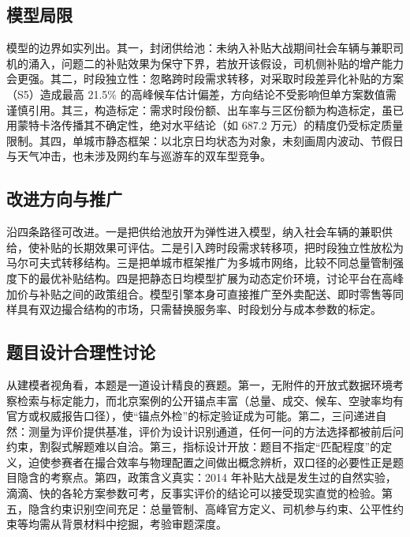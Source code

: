 \documentclass[12pt,a4paper]{ctexart}
\begin{document}
\subsection{模型局限}

模型的边界如实列出。其一，封闭供给池：未纳入补贴大战期间社会车辆与兼职司机的涌入，问题二的补贴效果为保守下界，若放开该假设，司机侧补贴的增产能力会更强。其二，时段独立性：忽略跨时段需求转移，对采取时段差异化补贴的方案（S5）造成最高 21.5\% 的高峰候车估计偏差，方向结论不受影响但单方案数值需谨慎引用。其三，构造标定：需求时段份额、出车率与三区份额为构造标定，虽已用蒙特卡洛传播其不确定性，绝对水平结论（如 687.2 万元）的精度仍受标定质量限制。其四，单城市静态框架：以北京日均状态为对象，未刻画周内波动、节假日与天气冲击，也未涉及网约车与巡游车的双车型竞争。

\subsection{改进方向与推广}

沿四条路径可改进。一是把供给池放开为弹性进入模型，纳入社会车辆的兼职供给，使补贴的长期效果可评估。二是引入跨时段需求转移项，把时段独立性放松为马尔可夫式转移结构。三是把单城市框架推广为多城市网络，比较不同总量管制强度下的最优补贴结构。四是把静态日均模型扩展为动态定价环境，讨论平台在高峰加价与补贴之间的政策组合。模型引擎本身可直接推广至外卖配送、即时零售等同样具有双边撮合结构的市场，只需替换服务率、时段划分与成本参数的标定。

\subsection{题目设计合理性讨论}

从建模者视角看，本题是一道设计精良的赛题。第一，无附件的开放式数据环境考察检索与标定能力，而北京案例的公开锚点丰富（总量、成交、候车、空驶率均有官方或权威报告口径），使“锚点外检”的标定验证成为可能。第二，三问递进自然：测量为评价提供基准，评价为设计识别通道，任何一问的方法选择都被前后问约束，割裂式解题难以自洽。第三，指标设计开放：题目不指定“匹配程度”的定义，迫使参赛者在撮合效率与物理配置之间做出概念辨析，双口径的必要性正是题目隐含的考察点。第四，政策含义真实：2014 年补贴大战是发生过的自然实验，滴滴、快的各轮方案参数可考，反事实评价的结论可以接受现实直觉的检验。第五，隐含约束识别空间充足：总量管制、高峰官方定义、司机参与约束、公平性约束等均需从背景材料中挖掘，考验审题深度。
\end{document}
